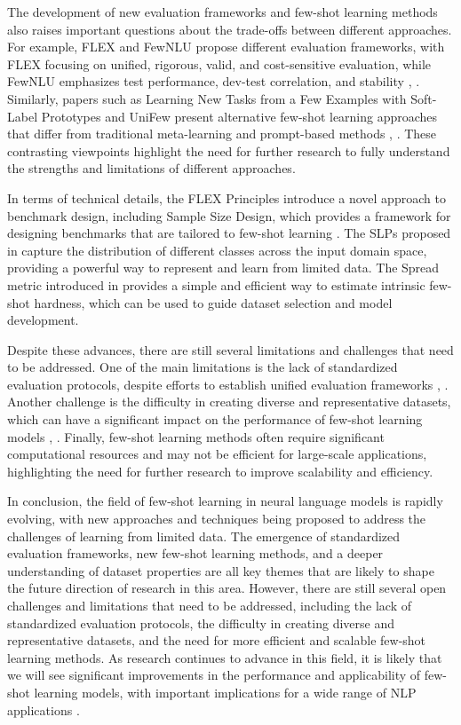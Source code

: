 \documentclass[conference]{IEEEtran}
\begin{document}
The development of new evaluation frameworks and few-shot learning methods also raises important questions about the trade-offs between different approaches. For example, FLEX and FewNLU propose different evaluation frameworks, with FLEX focusing on unified, rigorous, valid, and cost-sensitive evaluation, while FewNLU emphasizes test performance, dev-test correlation, and stability \cite{b4}, \cite{b5}. Similarly, papers such as Learning New Tasks from a Few Examples with Soft-Label Prototypes and UniFew present alternative few-shot learning approaches that differ from traditional meta-learning and prompt-based methods \cite{b7}, \cite{b8}. These contrasting viewpoints highlight the need for further research to fully understand the strengths and limitations of different approaches.

In terms of technical details, the FLEX Principles introduce a novel approach to benchmark design, including Sample Size Design, which provides a framework for designing benchmarks that are tailored to few-shot learning \cite{b4}. The SLPs proposed in \cite{b7} capture the distribution of different classes across the input domain space, providing a powerful way to represent and learn from limited data. The Spread metric introduced in \cite{b6} provides a simple and efficient way to estimate intrinsic few-shot hardness, which can be used to guide dataset selection and model development.

Despite these advances, there are still several limitations and challenges that need to be addressed. One of the main limitations is the lack of standardized evaluation protocols, despite efforts to establish unified evaluation frameworks \cite{b4}, \cite{b5}. Another challenge is the difficulty in creating diverse and representative datasets, which can have a significant impact on the performance of few-shot learning models \cite{b6}, \cite{b4}. Finally, few-shot learning methods often require significant computational resources and may not be efficient for large-scale applications, highlighting the need for further research to improve scalability and efficiency.

In conclusion, the field of few-shot learning in neural language models is rapidly evolving, with new approaches and techniques being proposed to address the challenges of learning from limited data. The emergence of standardized evaluation frameworks, new few-shot learning methods, and a deeper understanding of dataset properties are all key themes that are likely to shape the future direction of research in this area. However, there are still several open challenges and limitations that need to be addressed, including the lack of standardized evaluation protocols, the difficulty in creating diverse and representative datasets, and the need for more efficient and scalable few-shot learning methods. As research continues to advance in this field, it is likely that we will see significant improvements in the performance and applicability of few-shot learning models, with important implications for a wide range of NLP applications \cite{b1}.
\end{document}
